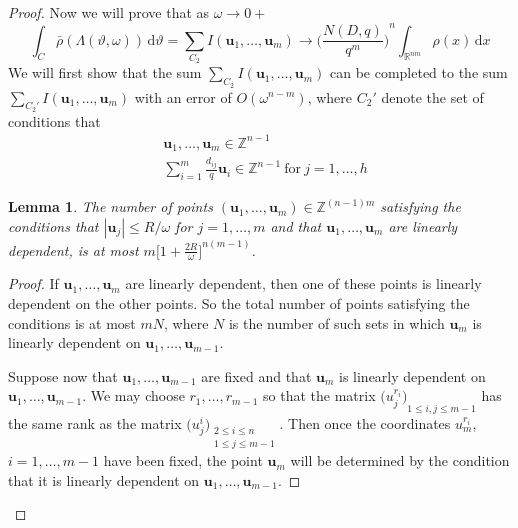 \documentclass[11pt]{article}
\newtheorem{lemma}[theorem]{Lemma}
\theoremstyle{definition}
\theoremstyle{proof}
\begin{document}
\begin{proof}
    Now we will prove that as $\omega \to 0+$
    \[
        \displaystyle\int_{C} \bar{\rho} (\Lambda (\vartheta, \omega )) \, \mathrm{d} \vartheta = \sum\limits_{C_2} I(\bm{u}_1, \ldots, \bm{u}_m) \to \displaystyle{\bigg(\frac{N(D, q)}{q^m} \bigg)}^n \int_{\mathbb{R}^{nm}} \rho (x) \, \mathrm{d} x 
    \]
    We will first show that the sum $\displaystyle\sum_{C_2} I(\bm{u}_1, \ldots, \bm{u}_m)$ can be completed to the sum $\displaystyle\sum\limits_{C_2'} I(\bm{u}_1, \ldots, \bm{u}_m)$ with an error of $O(\omega ^{n-m})$, where $C_2 '$ denote the set of conditions that
    \begin{equation}\label{C2'}
        \begin{split}
            & \bm{u}_1, \ldots, \bm{u}_m \in \mathbb{Z}^{n-1} \\
            & \displaystyle\sum_{i=1}^{m} \frac{d_{ij}}{q}\bm{u}_i \in \mathbb{Z}^{n-1} \ \text{for} \ j=1, \ldots, h
        \end{split}
    \end{equation}

    \begin{lemma}\label{duf}
        The number of points $(\bm{u}_1, \ldots, \bm{u}_m) \in \mathbb{Z}^{(n-1)m}$ satisfying the conditions that $|\bm{u}_j| \leq R/ \omega $ for $j = 1, \ldots, m$ and that $\bm{u}_1, \ldots, \bm{u}_m$ are linearly dependent, is at most $\displaystyle m {\bigg[1 + \frac{2R}{\omega }\bigg]}^{n(m-1)}$.
    \end{lemma}
    \begin{proof}
        If $\bm{u}_1, \ldots, \bm{u}_m$ are linearly dependent, then one of these points is linearly dependent on the other points.
        So the total number of points satisfying the conditions is at most $mN$, where $N$ is the number of such sets in which $\bm{u}_m$ is linearly dependent on $\bm{u}_1, \ldots, \bm{u}_{m-1}$.

        Suppose now that $\bm{u}_1, \ldots, \bm{u}_{m-1}$ are fixed and that $\bm{u}_m$ is linearly dependent on $\bm{u}_1, \ldots, \bm{u}_{m-1}$.
        We may choose $r_1, \ldots, r_{m-1}$ so that the matrix ${\big(u_j^{r_i} \big)}_{1 \leq i , j \leq m-1}$ has the same rank as the matrix ${\big(u_j^i\big)}_{\substack{2 \leq i \leq n \\ 1 \leq j \leq m-1}}$.
        Then once the coordinates $u_m^{r_i}$, $i = 1, \ldots, m-1$ have been fixed, the point $\bm{u}_m$ will be determined by the condition that it is linearly dependent on $\bm{u}_1, \ldots, \bm{u}_{m-1}$.


\end{proof}
\end{proof}
\end{document}
